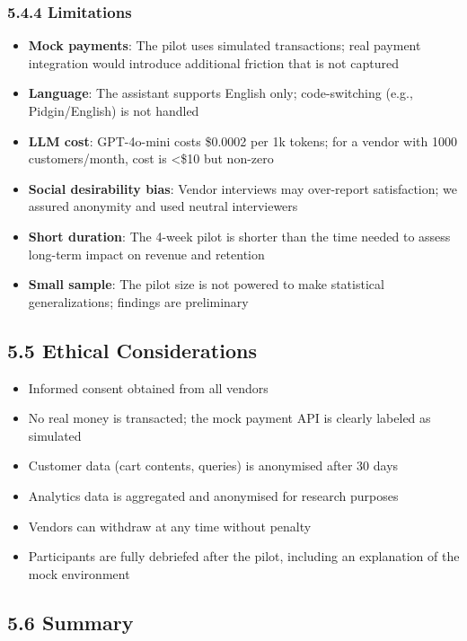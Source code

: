 \documentclass[12pt,a4paper]{article}
\begin{document}
\subsubsection{5.4.4 Limitations}

\begin{itemize}
    \item \textbf{Mock payments}: The pilot uses simulated transactions; real payment integration would introduce additional friction that is not captured
    \item \textbf{Language}: The assistant supports English only; code-switching (e.g., Pidgin/English) is not handled
    \item \textbf{LLM cost}: GPT-4o-mini costs \$0.0002 per 1k tokens; for a vendor with 1000 customers/month, cost is <\$10 but non-zero
    \item \textbf{Social desirability bias}: Vendor interviews may over-report satisfaction; we assured anonymity and used neutral interviewers
    \item \textbf{Short duration}: The 4-week pilot is shorter than the time needed to assess long-term impact on revenue and retention
    \item \textbf{Small sample}: The pilot size is not powered to make statistical generalizations; findings are preliminary
\end{itemize}

\subsection{5.5 Ethical Considerations}

\begin{itemize}
    \item Informed consent obtained from all vendors
    \item No real money is transacted; the mock payment API is clearly labeled as simulated
    \item Customer data (cart contents, queries) is anonymised after 30 days
    \item Analytics data is aggregated and anonymised for research purposes
    \item Vendors can withdraw at any time without penalty
    \item Participants are fully debriefed after the pilot, including an explanation of the mock environment
\end{itemize}

\subsection{5.6 Summary}
\end{document}
